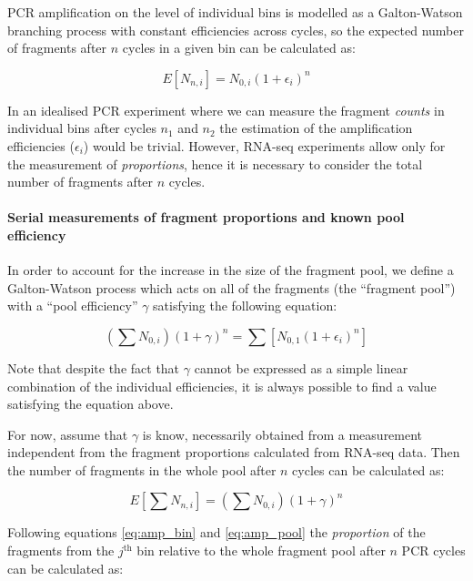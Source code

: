 PCR amplification on the level of individual bins is modelled as a Galton-Watson \cite{GaltonWatson} branching process with constant efficiencies across cycles, so the expected number of fragments after $n$ cycles in a given bin can be calculated as:

\begin{equation}\label{eq:amp_bin}
    E[N_{n,i}] = N_{0,i}(1+\epsilon_i)^n
\end{equation}

In an idealised PCR experiment where we can measure the fragment \emph{counts} in  individual bins after cycles $n_1$ and $n_2$ the estimation of the amplification efficiencies ($\epsilon_i$) would be trivial. However, RNA-seq experiments allow only for the measurement of \emph{proportions}, hence it is necessary to consider the total number of fragments after $n$ cycles.

\paragraph{Serial measurements of fragment proportions and known pool efficiency}

In order to account for the increase in the size of the fragment pool, we define a Galton-Watson process which acts on all of the fragments (the ``fragment pool'') with a ``pool efficiency'' $\gamma$ satisfying the following equation:

\begin{equation}
    \left(\sum{N_{0,i}}\right) ( 1 + \gamma)^n = \sum{\left[N_{0,1} ( 1 + \epsilon_i)^n\right]}
\end{equation}

Note that despite the fact that $\gamma$ cannot be expressed as a simple linear combination of the individual efficiencies, it is always possible to find a value satisfying the equation above. 

For now, assume that $\gamma$ is know, necessarily obtained from a measurement independent from the fragment proportions calculated from RNA-seq data.
Then the number of fragments in the whole pool after $n$ cycles can be calculated as:

\begin{equation}\label{eq:amp_pool}
    E[\sum N_{n,i}] = \left(\sum N_{0,i}\right) (1+\gamma)^n
\end{equation}

Following equations \ref{eq:amp_bin} and \ref{eq:amp_pool} the \emph{proportion} of the fragments from the $j^{\mathrm{th}}$ bin relative to the whole fragment pool after $n$ PCR cycles can be calculated as:

